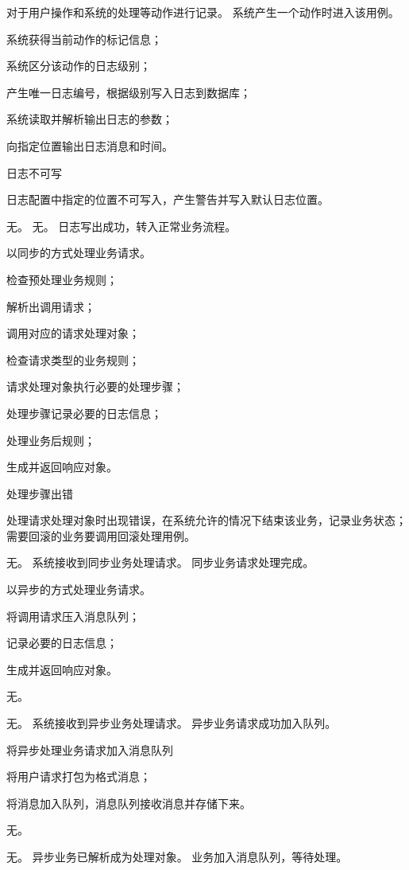 \documentclass[cs4size,a4paper,nofonts]{ctexart}
\begin{document}
{对于用户操作和系统的处理等动作进行记录。} %
{系统产生一个动作时进入该用例。} %
{
\item 系统获得当前动作的标记信息；
\item 系统区分该动作的日志级别；
\item 产生唯一日志编号，根据级别写入日志到数据库；
\item 系统读取并解析输出日志的参数；
\item 向指定位置输出日志消息和时间。
} %
{} %
{
\item 日志不可写\par
日志配置中指定的位置不可写入，产生警告并写入默认日志位置。
} %
{无。} %
{无。} %
{日志写出成功，转入正常业务流程。} %

{以同步的方式处理业务请求。} %
{} %
{
\item 检查预处理业务规则；
\item 解析出调用请求；
\item 调用对应的请求处理对象；
\item 检查请求类型的业务规则；
\item 请求处理对象执行必要的处理步骤；
\item 处理步骤记录必要的日志信息；
\item 处理业务后规则；
\item 生成并返回响应对象。
} %
{} %
{
\item 处理步骤出错\par
处理请求处理对象时出现错误，在系统允许的情况下结束该业务，记录业务状态；需要回滚的业务要调用回滚处理用例。
} %
{无。} %
{系统接收到同步业务处理请求。} %
{同步业务请求处理完成。} %

{以异步的方式处理业务请求。} %
{} %
{
\item 将调用请求压入消息队列；
\item 记录必要的日志信息；
\item 生成并返回响应对象。
} %
{} %
{
\item 无。
} %
{无。} %
{系统接收到异步业务处理请求。} %
{异步业务请求成功加入队列。} %

{将异步处理业务请求加入消息队列} %
{} %
{
\item 将用户请求打包为格式消息；
\item 将消息加入队列，消息队列接收消息并存储下来。
} %
{} %
{
\item 无。
} %
{无。} %
{异步业务已解析成为处理对象。} %
{业务加入消息队列，等待处理。} %
\end{document}
